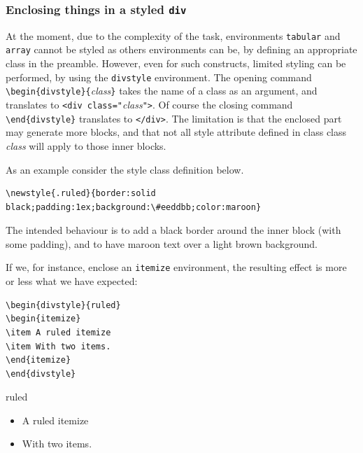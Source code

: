 \subsubsection{Enclosing things in a styled \texttt{div}}
%
%
At the moment, due to the complexity of the task, environments
\texttt{tabular} and \texttt{array} cannot be styled as others
environments can be, 
by defining an appropriate class in the preamble.
However, even for such constructs,
limited styling can be performed, by using
the \texttt{divstyle} environment.
The opening command \verb+\begin{divstyle}{+\textit{class}\verb+}+
takes the name of a class as
an argument, and translates to \verb+<div class="+\textit{class}\verb+">+.
Of course the closing command \verb+\end{divstyle}+ translates to
\verb+</div>+.
The limitation is that the enclosed part may generate more {\html}
blocks, and that not all style attribute defined in class class
\textit{class} will apply to those inner blocks.

As an example consider the style class definition below.
\begin{verbatim}
\newstyle{.ruled}{border:solid black;padding:1ex;background:\#eeddbb;color:maroon}
\end{verbatim}
The intended behaviour is to add a black border around the inner block
(with some padding), and to have {\ifhevea\maroon maroon\else\fi} text over
a light brown background.

If we, for instance, enclose an \texttt{itemize} environment, the
resulting effect is more or less what we have expected:
\begin{verbatim}
\begin{divstyle}{ruled}
\begin{itemize}
\item A ruled itemize
\item With two items.
\end{itemize}
\end{divstyle}
\end{verbatim}
\begin{htmlonly}
\begin{divstyle}{ruled}
\begin{itemize}
\item A ruled itemize
\item With two items.
\end{itemize}
\end{divstyle}
\end{htmlonly}

